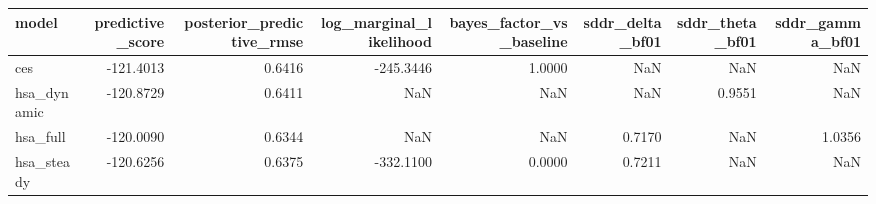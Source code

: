 \begin{tabular}{lrrrrrrr}
\toprule
model & predictive\_score & posterior\_predictive\_rmse & log\_marginal\_likelihood & bayes\_factor\_vs\_baseline & sddr\_delta\_bf01 & sddr\_theta\_bf01 & sddr\_gamma\_bf01 \\
\midrule
ces & -121.4013 & 0.6416 & -245.3446 & 1.0000 & NaN & NaN & NaN \\
hsa\_dynamic & -120.8729 & 0.6411 & NaN & NaN & NaN & 0.9551 & NaN \\
hsa\_full & -120.0090 & 0.6344 & NaN & NaN & 0.7170 & NaN & 1.0356 \\
hsa\_steady & -120.6256 & 0.6375 & -332.1100 & 0.0000 & 0.7211 & NaN & NaN \\
\bottomrule
\end{tabular}
